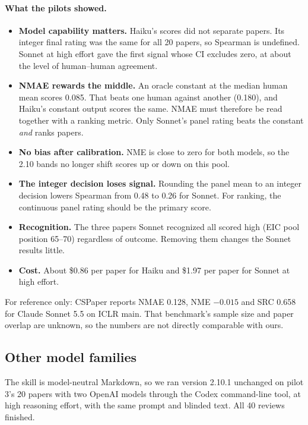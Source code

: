\documentclass[11pt,a4paper]{article}
\begin{document}
\paragraph{What the pilots showed.}
\begin{itemize}
\item \textbf{Model capability matters.} Haiku's scores did not separate papers. Its integer final
rating was the same for all 20 papers, so Spearman is undefined. Sonnet at high effort gave the
first signal whose CI excludes zero, at about the level of human--human agreement.
\item \textbf{NMAE rewards the middle.} An oracle constant at the median human mean scores 0.085.
That beats one human against another (0.180), and Haiku's constant output scores the same.
NMAE must therefore be read together with a ranking metric. Only Sonnet's panel rating beats the
constant \emph{and} ranks papers.
\item \textbf{No bias after calibration.} NME is close to zero for both models, so the 2.10 bands
no longer shift scores up or down on this pool.
\item \textbf{The integer decision loses signal.} Rounding the panel mean to an integer decision
lowers Spearman from 0.48 to 0.26 for Sonnet. For ranking, the continuous panel rating should be the
primary score.
\item \textbf{Recognition.} The three papers Sonnet recognized all scored high (EIC pool position
65--70) regardless of outcome. Removing them changes the Sonnet results little.
\item \textbf{Cost.} About \$0.86 per paper for Haiku and \$1.97 per paper for Sonnet at high
effort.
\end{itemize}
For reference only: CSPaper reports NMAE 0.128, NME $-0.015$ and SRC 0.658 for Claude Sonnet 5.5
on ICLR main. That benchmark's sample size and paper overlap are unknown, so the numbers are not
directly comparable with ours.

\subsection{Other model families}\label{sec:gpt}
The skill is model-neutral Markdown, so we ran version 2.10.1 unchanged on pilot 3's 20 papers
with two OpenAI models through the Codex command-line tool, at high reasoning effort, with the
same prompt and blinded text. All 40 reviews finished.
\end{document}
